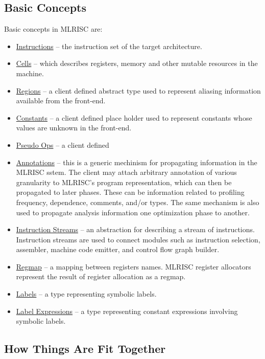 \subsection{Basic Concepts}

  Basic concepts in MLRISC are: 
\begin{itemize}
    \item \href{instructions.html}{Instructions} --
    the instruction set of the target architecture.
    \item \href{cells.html}{Cells} -- which describes registers,
memory and other mutable resources in the machine.
    \item \href{regions.html}{Regions} -- a client defined
   abstract type used to represent aliasing information available from
the front-end.
    \item \href{constants.html}{Constants} -- a client defined
   place holder used to represent constants whose values are unknown 
   in the front-end. 
    \item \href{pseudo-ops.html}{Pseudo Ops} -- a client defined
      
    \item \href{annotations.html}{Annotations} -- this is
   a generic mechinism for propagating information in the MLRISC sstem.
   The client may attach arbitrary annotation of various granularity 
   to MLRISC's program representation,
   which can then be propagated to later phases.
   These can be information related to profiling frequency, dependence, 
   comments, and/or types.
   The same mechanism is also used to propagate 
   analysis information one optimization phase to 
   another.
    \item \href{streams.html}{Instruction Streams} -- an abstraction
   for describing a stream of instructions.  Instruction streams are
   used to connect modules such as instruction selection,  assembler, 
   machine code emitter, and 
   control flow graph builder.
   \item \href{regmap.html}{Regmap} -- a mapping between registers
     names.  MLRISC register allocators represent the result of register
   allocation as a regmap.
   \item \href{labels.html}{Labels} -- a type representing
symbolic labels.
   \item \href{labelexp.html}{Label Expressions} -- a type representing
     constant expressions
    involving symbolic labels.
\end{itemize}

\subsection{How Things Are Fit Together}

